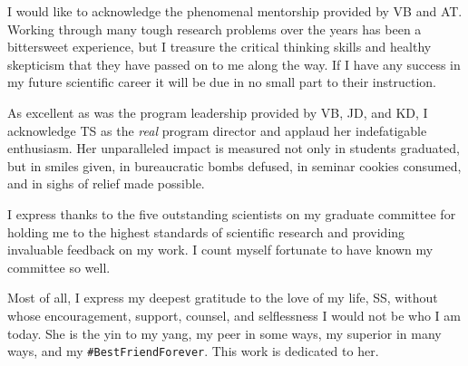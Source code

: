 
I would like to acknowledge the phenomenal mentorship provided by VB and AT.
Working through many tough research problems over the years has been a bittersweet experience, but I treasure the critical thinking skills and healthy skepticism that they have passed on to me along the way.
If I have any success in my future scientific career it will be due in no small part to their instruction.

As excellent as was the program leadership provided by VB, JD, and KD, I acknowledge TS as the \textit{real} program director and applaud her indefatigable enthusiasm.
Her unparalleled impact is measured not only in students graduated, but in smiles given, in bureaucratic bombs defused, in seminar cookies consumed, and in sighs of relief made possible.

I express thanks to the five outstanding scientists on my graduate committee for holding me to the highest standards of scientific research and providing invaluable feedback on my work.
I count myself fortunate to have known my committee so well.

Most of all, I express my deepest gratitude to the love of my life, SS, without whose encouragement, support, counsel, and selflessness I would not be who I am today.
She is the yin to my yang, my peer in some ways, my superior in many ways, and my \texttt{\#BestFriendForever}.
This work is dedicated to her.
